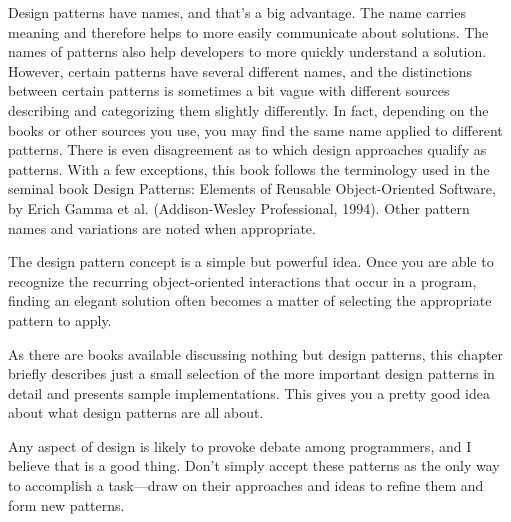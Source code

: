 Design patterns have names, and that’s a big advantage. The name carries meaning and therefore helps to more easily communicate about solutions. The names of patterns also help developers to more quickly understand a solution. However, certain patterns have several different names, and the distinctions between certain patterns is sometimes a bit vague with different sources describing and categorizing them slightly differently. In fact, depending on the books or other sources you use, you may find the same name applied to different patterns. There is even disagreement as to which design approaches qualify as patterns. With a few exceptions, this book follows the terminology used in the seminal book Design Patterns: Elements of Reusable Object-Oriented Software, by Erich Gamma et al. (Addison-Wesley Professional, 1994). Other pattern names and variations are noted when appropriate.

The design pattern concept is a simple but powerful idea. Once you are able to recognize the recurring object-oriented interactions that occur in a program, finding an elegant solution often becomes a matter of selecting the appropriate pattern to apply.

As there are books available discussing nothing but design patterns, this chapter briefly describes just a small selection of the more important design patterns in detail and presents sample implementations. This gives you a pretty good idea about what design patterns are all about.

Any aspect of design is likely to provoke debate among programmers, and I believe that is a good thing. Don’t simply accept these patterns as the only way to accomplish a task—draw on their approaches and ideas to refine them and form new patterns.









